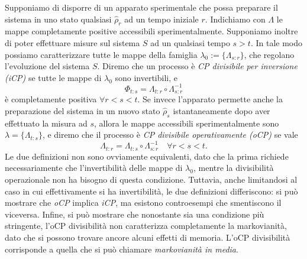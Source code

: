 Supponiamo di disporre di un apparato sperimentale che possa preparare il sistema in uno stato qualsiasi \(\hat{\rho}_r\) ad un tempo iniziale \(r\). Indichiamo con \(\Lambda\) le mappe completamente positive accessibili sperimentalmente. Supponiamo inoltre di poter effettuare misure sul sistema \(S\) ad un qualsiasi tempo \(s>t\). In tale modo possiamo caratterizzare tutte le mappe della famiglia \(\lambda_0 := \{\Lambda_{s\colon r}\}\), che regolano l'evoluzione del sistema \(S\). Diremo che un processo è \emph{CP divisibile per inversione (iCP)} se tutte le mappe di \(\lambda_0\) sono invertibili, e \[\Phi_{t\colon s} = \Lambda_{t\colon r} \circ \Lambda^{-1}_{s\colon r}\] è completamente positiva \(\forall r<s<t \). Se invece l'apparato permette anche la preparazione del sistema in un nuovo stato \(\hat{\rho}_s\) istantaneamente dopo aver effettuato la misura ad \(s\), allora le mappe accessibili sperimentalmente sono \(\lambda = \{\Lambda_{t\colon s}\}\), e diremo che il processo è \emph{CP divisibile operativamente (oCP)} se vale
\[\Lambda_{t\colon r} = \Lambda_{t\colon s} \circ \Lambda^{-1}_{s\colon r} \quad \forall r < s <  t.\]
Le due definizioni non sono ovviamente equivalenti, dato che la prima richiede necessariamente che l'invertibilità delle mappe di \(\lambda_0\), mentre la divisibilità operazionale non ha bisogno di questa condizione. Tuttavia, anche limitandosi al caso in cui effettivamente si ha invertibilità, le due definizioni differiscono: si può mostrare che \emph{oCP} implica \emph{iCP}, ma esistono controesempi che smentiscono il viceversa. Infine, si può mostrare che nonostante sia una condizione più stringente, l'oCP divisibilità non caratterizza completamente la markovianità, dato che si possono trovare ancore alcuni effetti di memoria. L'oCP divisibilità corrisponde a quella che si può chiamare \emph{markovianità in media}.
